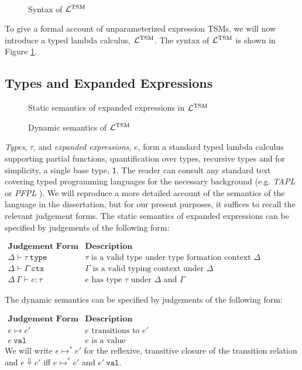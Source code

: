 {\begin{figure}
\\
\caption{Syntax of $\mathcal{L}^\text{TSM}$}
\label{fig:lambda-tsm-syntax}
\end{figure}


To give a formal account of unparameterized expression TSMs, we will now introduce a typed lambda calculus, $\mathcal{L}^\text{TSM}$. The syntax of $\mathcal{L}^\text{TSM}$ is shown in Figure \ref{fig:lambda-tsm-syntax}.

\subsection{Types and Expanded Expressions}
\begin{figure}
\caption{Static semantics of expanded expressions in $\mathcal{L}^\text{TSM}$}
\label{fig:expanded-statics}
\end{figure}
\begin{figure}
\caption{Dynamic semantics of $\mathcal{L}^\text{TSM}$}
\label{fig:expanded-dynamics}
\end{figure}
\emph{Types}, $\tau$, and \emph{expanded expressions}, $e$, form a standard typed lambda calculus supporting partial functions, quantification over types, recursive types and for simplicity, a single base type, $\mathsf{1}$. The reader can consult any standard text covering typed programming languages for the necessary background (e.g. \emph{TAPL} \cite{tapl} or \emph{PFPL} \cite{pfpl}). We will reproduce a more detailed account of the semantics of the language in the dissertation, but for our present purposes, it suffices to recall the relevant judgement forms. The static  semantics of expanded expressions can be specified by judgements of the following form:

$\begin{array}{ll}
\textbf{Judgement Form} & \textbf{Description}\\
\Delta \vdash \tau~\mathtt{type} & \text{$\tau$ is a valid type under type formation context $\Delta$}\\
\Delta \vdash \Gamma~\mathtt{ctx} & \text{$\Gamma$ is a valid typing context under $\Delta$}\\
\Delta~\Gamma \vdash e : \tau & \text{$e$ has type $\tau$ under $\Delta$ and $\Gamma$}
\end{array}$

\noindent
The dynamic semantics can be specified by judgements of the following form:

$\begin{array}{ll}
\textbf{Judgement Form} & \textbf{Description}\\
e \mapsto e' & \text{$e$ transitions to $e'$}\\
e~\mathtt{val} & \text{$e$ is a value}
\end{array}$
\\\noindent
We will write $e \mapsto^* e'$ for the reflexive, transitive closure of the transition relation and $e \Downarrow e'$ iff $e \mapsto^* e'$ and $e'~\mathtt{val}$.

}
